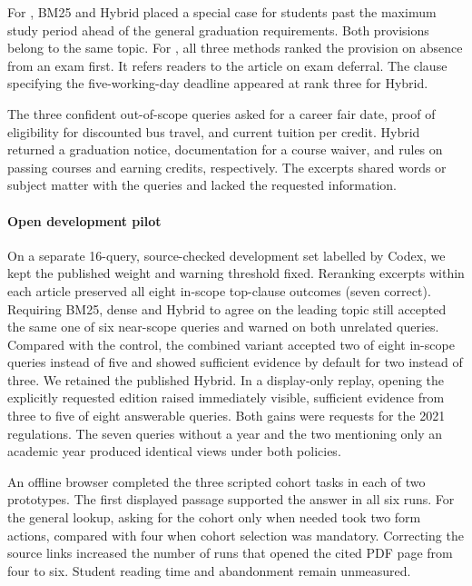 For , BM25 and Hybrid placed a special case
for students past the maximum study period ahead of the general
graduation requirements. Both provisions belong to the same topic.
For , all three methods ranked the provision
on absence from an exam first. It refers readers to the article on
exam deferral. The clause specifying the five-working-day deadline
appeared at rank three for Hybrid.

The three confident out-of-scope queries asked for a career fair date,
proof of eligibility for discounted bus travel, and current tuition per
credit. Hybrid returned a graduation notice, documentation for a
course waiver, and rules on passing courses and earning credits,
respectively. The excerpts shared words or subject matter with the
queries and lacked the requested information.

\paragraph{Open development pilot}
On a separate 16-query, source-checked development set labelled by Codex,
we kept the published weight and warning threshold fixed. Reranking
excerpts within each article preserved all eight in-scope top-clause
outcomes (seven correct). Requiring BM25, dense and Hybrid to agree
on the leading topic still accepted the same one of six near-scope
queries and warned on both unrelated queries.
Compared with the control, the combined variant accepted two of eight
in-scope queries instead of five and showed sufficient evidence by
default for two instead of three. We retained the published Hybrid.
In a display-only replay, opening the explicitly requested edition
raised immediately visible, sufficient evidence from three to five of
eight answerable queries. Both gains were requests for the 2021
regulations. The seven queries without a year and the two mentioning
only an academic year produced identical views under both policies.

An offline browser completed the three scripted cohort tasks in each
of two prototypes. The first displayed passage supported the answer
in all six runs. For the general lookup, asking for the cohort only
when needed took two form actions, compared with four when cohort
selection was mandatory. Correcting the source links increased the
number of runs that opened the cited PDF page from four to six.
Student reading time and abandonment remain unmeasured.
